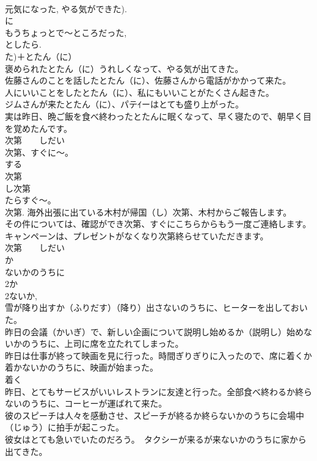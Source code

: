\documentclass[8pt]{extreport}
\begin{document}
\begin{CJK}{UTF8}{min}
\\	元気になった, やる気ができた). 
\\	に 
\\	もうちょっとで～ところだった, 
\\	としたら. 
\\	た)＋とたん（に） 
\\	褒められたとたん（に）うれしくなって、やる気が出てきた。 
\\	佐藤さんのことを話したとたん（に）、佐藤さんから電話がかかって来た。 
\\	人にいいことをしたとたん（に）、私にもいいことがたくさん起きた。 
\\	ジムさんが来たとたん（に）、パテｲーはとても盛り上がった。 
\\	実は昨日、晩ご飯を食べ終わったとたんに眠くなって、早く寝たので、朝早く目を覚めたんです。 
\\	次第　　しだい 
\\	次第、すぐに～。 
\\	する 
\\	次第 
\\	し次第 
\\	たらすぐ～。 
\\	次第. 海外出張に出ている木村が帰国（し）次第、木村からご報告します。 
\\	その件については、確認ができ次第、すぐにこちらからもう一度ご連絡します。 
\\	キャンペーンは、プレゼントがなくなり次第終らせていただきます。 
\\	次第　　しだい 
\\	か
\\	ないかのうちに 
\\	2か
\\	2ないか, 
\\	雪が降り出すか（ふりだす）（降り）出さないのうちに、ヒーターを出しておいた。 
\\	昨日の会議（かいぎ）で、新しい企画について説明し始めるか（説明し）始めないかのうちに、上司に席を立たれてしまった。 
\\	昨日は仕事が終って映画を見に行った。時間ぎりぎりに入ったので、席に着くか着かないかのうちに、映画が始まった。 
\\	着く 
\\	昨日、とてもサービスがいいレストランに友達と行った。全部食べ終わるか終らないのうちに、コーヒーが運ばれて来た。 
\\	彼のスピーチは人々を感動させ、スピーチが終るか終らないかのうちに会場中（じゅう）に拍手が起こった。 
\\	彼女はとても急いでいたのだろう。　タクシーが来るが来ないかのうちに家から出てきた。 

\end{CJK}
\end{document}
